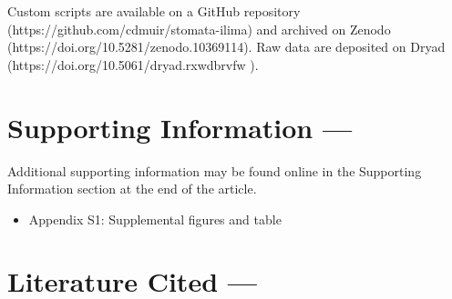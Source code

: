 \documentclass[
  letterpaper,
  DIV=11,
  numbers=noendperiod]{scrartcl}
\providecommand{\tightlist}{%
  \setlength{\itemsep}{0pt}\setlength{\parskip}{0pt}}\usepackage{longtable,booktabs,array}
\begin{document}
Custom scripts are available on a GitHub repository
(https://github.com/cdmuir/stomata-ilima) and archived on Zenodo
(https://doi.org/10.5281/zenodo.10369114). Raw data are deposited on
Dryad (https://doi.org/10.5061/dryad.rxwdbrvfw ).

\hypertarget{supporting-information}{%
\section{Supporting Information ---}\label{supporting-information}}

Additional supporting information may be found online in the Supporting
Information section at the end of the article.

\begin{itemize}
\tightlist
\item
  Appendix S1: Supplemental figures and table
\end{itemize}

\newpage

\hypertarget{literature-cited}{%
\section{Literature Cited ---}\label{literature-cited}}
\end{document}

